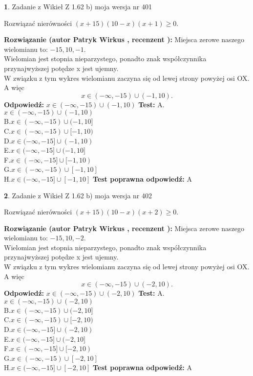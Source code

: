 \documentclass[12pt, a4paper]{article}
\theoremstyle{definition} %
\newtheorem{zad}{}
\newcommand{\zadStart}[1]{\begin{zad}#1\newline}
\newcommand{\zadStop}{\end{zad}}
\newcommand{\rozwStart}[2]{\noindent \textbf{Rozwiązanie (autor #1 , recenzent #2): }\newline}
\newcommand{\rozwStop}{\newline}
\newcommand{\odpStart}{\noindent \textbf{Odpowiedź:}\newline}
\newcommand{\odpStop}{\newline}
\newcommand{\testStart}{\noindent \textbf{Test:}\newline}
\newcommand{\testStop}{\newline}
\newcommand{\kluczStart}{\noindent \textbf{Test poprawna odpowiedź:}\newline}
\newcommand{\kluczStop}{\newline}
\begin{document}
\zadStart{Zadanie z Wikieł Z 1.62 b) moja wersja nr 401}

Rozwiązać nierówności $(x+15)(10-x)(x+1)\ge0$.
\zadStop
\rozwStart{Patryk Wirkus}{}
Miejsca zerowe naszego wielomianu to: $-15, 10, -1$.\\
Wielomian jest stopnia nieparzystego, ponadto znak współczynnika przy\linebreak najwyższej potędze x jest ujemny.\\ W związku z tym wykres wielomianu zaczyna się od lewej strony powyżej osi OX. A więc $$x \in (-\infty,-15) \cup (-1,10).$$
\rozwStop
\odpStart
$x \in (-\infty,-15) \cup (-1,10)$
\odpStop
\testStart
A.$x \in (-\infty,-15) \cup (-1,10)$\\
B.$x \in (-\infty,-15) \cup (-1,10]$\\
C.$x \in (-\infty,-15) \cup [-1,10)$\\
D.$x \in (-\infty,-15] \cup (-1,10)$\\
E.$x \in (-\infty,-15] \cup (-1,10]$\\
F.$x \in (-\infty,-15] \cup [-1,10)$\\
G.$x \in (-\infty,-15) \cup [-1,10]$\\
H.$x \in (-\infty,-15] \cup [-1,10]$
\testStop
\kluczStart
A
\kluczStop



\zadStart{Zadanie z Wikieł Z 1.62 b) moja wersja nr 402}

Rozwiązać nierówności $(x+15)(10-x)(x+2)\ge0$.
\zadStop
\rozwStart{Patryk Wirkus}{}
Miejsca zerowe naszego wielomianu to: $-15, 10, -2$.\\
Wielomian jest stopnia nieparzystego, ponadto znak współczynnika przy\linebreak najwyższej potędze x jest ujemny.\\ W związku z tym wykres wielomianu zaczyna się od lewej strony powyżej osi OX. A więc $$x \in (-\infty,-15) \cup (-2,10).$$
\rozwStop
\odpStart
$x \in (-\infty,-15) \cup (-2,10)$
\odpStop
\testStart
A.$x \in (-\infty,-15) \cup (-2,10)$\\
B.$x \in (-\infty,-15) \cup (-2,10]$\\
C.$x \in (-\infty,-15) \cup [-2,10)$\\
D.$x \in (-\infty,-15] \cup (-2,10)$\\
E.$x \in (-\infty,-15] \cup (-2,10]$\\
F.$x \in (-\infty,-15] \cup [-2,10)$\\
G.$x \in (-\infty,-15) \cup [-2,10]$\\
H.$x \in (-\infty,-15] \cup [-2,10]$
\testStop
\kluczStart
A
\kluczStop
\end{document}

